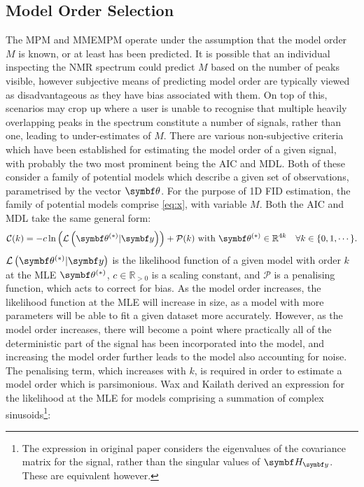 \subsection{Model Order Selection}
\label{subsec:model-order}
The \ac{MPM} and \ac{MMEMPM} operate under the assumption that the model order
$M$ is known, or at least has been predicted.
It is possible that an individual inspecting the \ac{NMR} spectrum could
predict $M$ based on the number of peaks visible, however subjective means of
predicting model order are typically viewed as disadvantageous as they have bias
associated with them. On top of this, scenarios may crop up where a user is
unable to recognise that multiple heavily overlapping peaks in the spectrum
constitute a number of signals, rather than one, leading to under-estimates of
$M$.
There are various non-subjective criteria which have been established for
estimating the model order of a given signal, with probably the two most
prominent being the \ac{AIC}\cite{Akaike1974} and
\ac{MDL}\cite{Schwarz1978,Rissanen1978}. Both of these consider a family of
potential models which describe a given set of observations, parametrised by
the vector $\bth$. For the purpose of \ac{1D} \ac{FID} estimation, the family
of potential models comprise \cref{eq:x}, with variable $M$. Both the \ac{AIC}
and \ac{MDL} take the same general form:
\begin{equation}
    \mathcal{C}(k) = -c \ln \left(\mathcal{L} \left(\bthstar | \by \right)
    \right) + \mathcal{P}(k) \text{ with } \bthstar \in \mathbb{R}^{4k}
    \quad \forall k \in \lbrace 0, 1, \cdots \rbrace.
\end{equation}
 $\mathcal{L} \left(\bthstar |
\by \right)$ is the likelihood
function of a given model with order $k$ at the \ac{MLE}
$\bthstar$, $c \in \mathbb{R}_{>0}$ is a scaling
constant, and $\mathcal{P}$ is a penalising function, which acts to correct
for bias. As the model order increases, the likelihood function at the \ac{MLE}
will increase in size, as a model with more parameters will be able to fit a
given dataset more accurately. However, as the model order increases, there will
become a point where practically all of the deterministic part of the signal
has been incorporated into the model, and increasing the model order further
leads to the model also accounting for noise. The penalising term, which
increases with $k$, is required in order to estimate a model
order which is parsimonious. Wax and Kailath derived an expression for
the likelihood at the \ac{MLE} for models comprising a summation of
complex sinusoids\cite{Wax1985}\footnote{
    The expression in original paper considers the eigenvalues of the
    covariance matrix for the signal, rather than the singular values of $\Hy$.
    These are equivalent however.
}:
